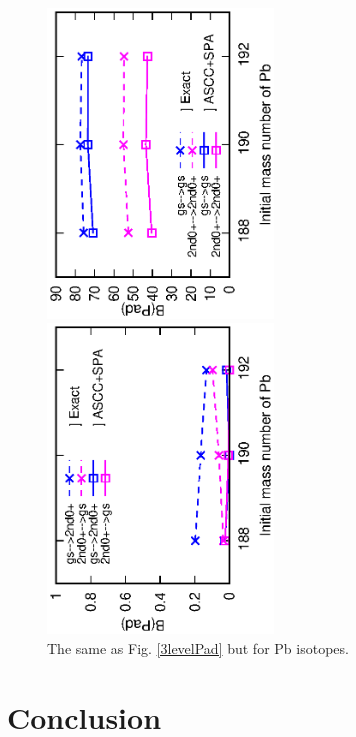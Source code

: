 \documentclass[%
superscriptaddress,
showpacs,
nofootinbib,
amsmath,amssymb,
aps,
prc,
twocolumn,
floatfix ]%
{revtex4-1}
\begin{document}
\begin{figure}[htbp]
 \begin{center}
  \includegraphics[width=60mm,angle=-90]{Pbintra_trans.eps}
 \end{center}
 \begin{center}
  \includegraphics[width=60mm,angle=-90]{Pbinter_trans.eps}
 \end{center}
	\caption{The same as Fig. \ref{3levelPad} but for Pb isotopes.
}
 \label{PbPad}
\end{figure}


\section{Conclusion}
\end{document}
